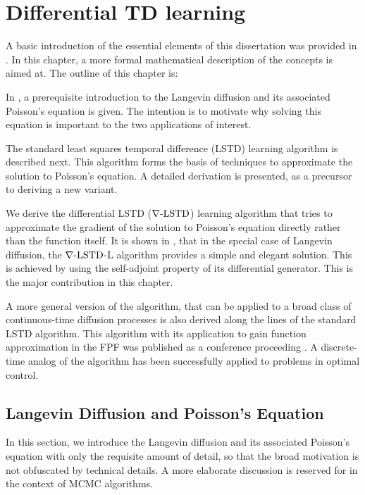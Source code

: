 \chapter{Differential TD learning} %
\label{ch:diff_td}
A basic introduction of the essential elements of this dissertation was provided in . In this chapter, a more formal mathematical description of the concepts is aimed at. The outline of this chapter is:
\begin{romannum}
\item In , a prerequisite introduction to the Langevin diffusion and its associated Poisson's equation is given. The intention is to motivate why solving this equation is important to the two applications of interest.
\item The standard least squares temporal difference (LSTD) learning algorithm is described next. This algorithm forms the basis of techniques to approximate the solution to Poisson's equation. A detailed derivation is presented, as a precursor to deriving a new variant.
\item We derive the differential LSTD ($\nabla\text{-LSTD}$) learning algorithm that tries to approximate the gradient of the solution to Poisson's equation directly rather than the function itself.
It is shown in , that in the special case of Langevin diffusion, the $\nabla\text{-LSTD}$-L algorithm provides a simple and elegant solution. This is achieved by using the self-adjoint property of its differential generator. This is the major contribution in this chapter. 
\item A more general version of the algorithm, that can be applied to a broad class of continuous-time diffusion processes is also derived along the lines of the standard LSTD algorithm. This algorithm with its application to gain function approximation in the FPF was published as a conference proceeding \cite{raddevmey16}. A discrete-time analog of the algorithm has been successfully applied to problems in optimal control. 
\end{romannum}

\section{Langevin Diffusion and Poisson's Equation}
\label{s:langevin_diffusion}
In this section, we introduce the Langevin diffusion and its associated Poisson's equation with only the requisite amount of detail, so that the broad motivation is not obfuscated by technical details. A more elaborate discussion is reserved for  in the context of MCMC algorithms. 

